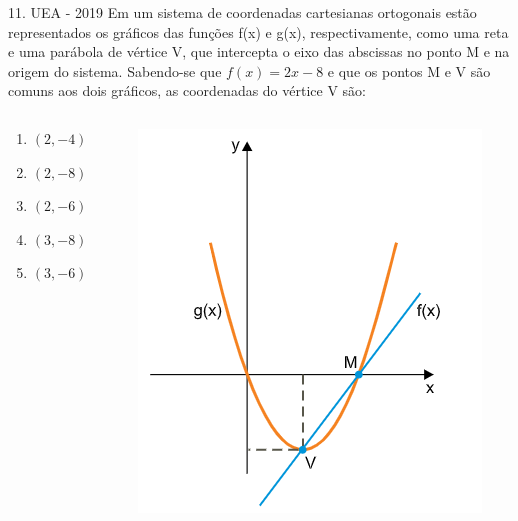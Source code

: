 \documentclass[11pt]{beamer}
\begin{document}
\begin{frame}{11. UEA - 2019}
    Em um sistema de coordenadas cartesianas ortogonais estão representados os gráficos das funções f(x) e g(x), respectivamente, como uma reta e uma parábola de vértice V, que intercepta o eixo das abscissas no ponto M e na origem do sistema. Sabendo-se que $f(x) = 2x - 8$ e que os pontos M e V são comuns aos dois gráficos, as coordenadas do vértice V são:

    \begin{columns}
        \begin{column}{0.4\textwidth}
            \begin{enumerate}[a]
                \item $(2,-4)$ %
                \item $(2,-8)$
                \item $(2,-6)$
                \item $(3,-8)$
                \item $(3,-6)$
            \end{enumerate}
        \end{column}

        \begin{column}{0.45\textwidth}
            \centering
            \includegraphics[width=0.8\linewidth]{imagens/uea-macro-2019.png}
        \end{column}
    \end{columns}
\end{frame}
\end{document}
